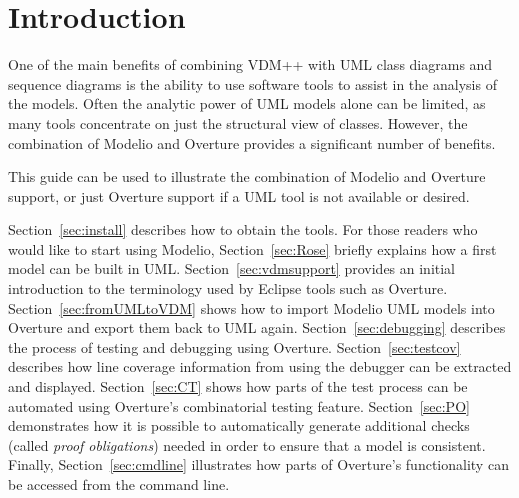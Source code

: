\section{Introduction}
One of the main benefits of combining VDM++ with UML class diagrams and sequence diagrams is the ability to use software tools to assist in the analysis of the models. Often the analytic power of UML models alone can be limited, as many tools concentrate on just the structural view of classes. However, the combination of Modelio 
and Overture provides a significant number of benefits.

This guide can be used to illustrate the combination of Modelio
and Overture support, or just Overture support if a UML tool is not available or desired.

Section~\ref{sec:install} describes how to obtain the tools. For those readers who would like to start using Modelio, Section~\ref{sec:Rose} briefly explains how a first model can be built in UML.  Section~\ref{sec:vdmsupport} provides an initial introduction to the terminology used by Eclipse tools such as Overture. Section~\ref{sec:fromUMLtoVDM} shows how to import Modelio UML models into Overture and export them back to UML again.
Section~\ref{sec:debugging} describes the process of testing and debugging using Overture. Section~\ref{sec:testcov}  describes how line coverage information from using the debugger can be extracted and displayed. Section~\ref{sec:CT} shows how parts of the test process can be automated using Overture's combinatorial testing feature. Section~\ref{sec:PO} demonstrates how it is possible to automatically generate additional checks (called \emph{proof obligations}) needed in order to ensure that a model is consistent.  Finally, Section~\ref{sec:cmdline} illustrates how parts of Overture's functionality can be accessed from the command line.
%
